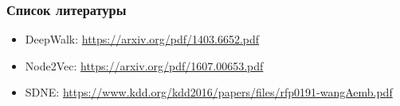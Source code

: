 \documentclass{beamer}
\begin{document}
\begin{frame}
\frametitle{Список литературы}
\begin{itemize}
    \item DeepWalk: \url{https://arxiv.org/pdf/1403.6652.pdf}
    \item Node2Vec: \url{https://arxiv.org/pdf/1607.00653.pdf}
    \item SDNE: \url{https://www.kdd.org/kdd2016/papers/files/rfp0191-wangAemb.pdf}
\end{itemize}
\end{frame}
\end{document}
